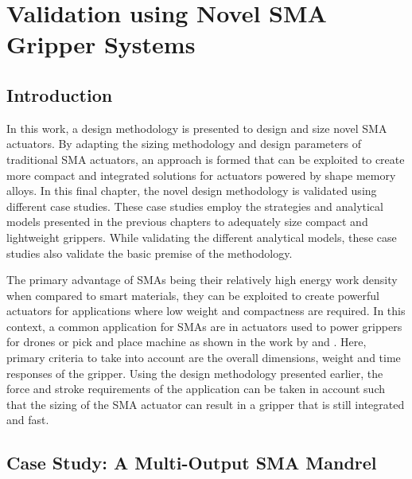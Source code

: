 
\chapter{Validation using Novel SMA Gripper Systems}\label{chap:case-study}
\section{Introduction}
In this work, a design methodology is presented to design and size novel SMA actuators. By adapting the sizing methodology and design parameters of traditional SMA actuators, an approach is formed that can be exploited to create more compact and integrated solutions for actuators powered by shape memory alloys. In this final chapter, the novel design methodology is validated using different case studies. These case studies employ the strategies and analytical models presented in the previous chapters to adequately size compact and lightweight grippers. While validating the different analytical models, these case studies also validate the basic premise of the methodology.

The primary advantage of SMAs being their relatively high energy work density when compared to smart materials, they can be exploited to create powerful actuators for applications where low weight and compactness are required. In this context, a common application for SMAs are in actuators used to power grippers for drones or pick and place machine as shown in the work by \todocite and \todocite. Here, primary criteria to take into account are the overall dimensions, weight and time responses of the gripper. Using the design methodology presented earlier, the force and stroke requirements of the application can be taken in account such that the sizing of the SMA actuator can result in a gripper that is still integrated and fast.
\section{Case Study: A Multi-Output SMA Mandrel}\label{sec:smacm-mandrel}
